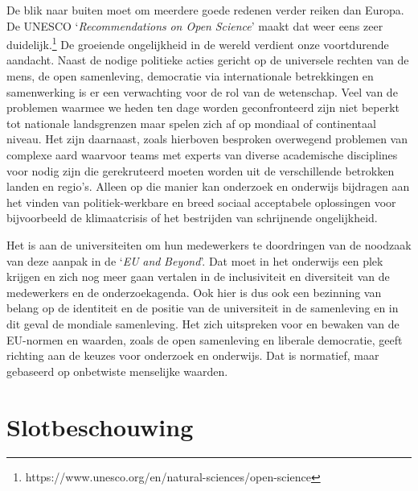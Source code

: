 \documentclass[smallauthor, chapterhaspagenum, nochapterinheader, pagenuminheader,  bigchapnum,medium2, tocpages,  garamond, titleinheader]{jote-book}
\begin{document}
	De blik naar buiten moet om meerdere goede redenen verder reiken dan Europa. De UNESCO ‘\emph{Recommendations}\emph{ on Open }\emph{Science}' maakt dat weer eens zeer duidelijk.\footnote{https://www.unesco.org/en/natural-sciences/open-science} De groeiende ongelijkheid in de wereld verdient onze voortdurende aandacht. Naast de nodige politieke acties gericht op de universele rechten van de mens, de open samenleving, democratie via internationale betrekkingen en samenwerking is er een verwachting voor de rol van de wetenschap. Veel van de problemen waarmee we heden ten dage worden geconfronteerd zijn niet beperkt tot nationale landsgrenzen maar spelen zich af op mondiaal of continentaal niveau. Het zijn daarnaast, zoals hierboven besproken overwegend problemen van complexe aard waarvoor teams met experts van diverse academische disciplines voor nodig zijn die gerekruteerd moeten worden uit de verschillende betrokken landen en regio's. Alleen op die manier kan onderzoek en onderwijs bijdragen aan het vinden van politiek-werkbare en breed sociaal acceptabele oplossingen voor bijvoorbeeld de klimaatcrisis of het bestrijden van schrijnende ongelijkheid.



	Het is aan de universiteiten om hun medewerkers te doordringen van de noodzaak van deze aanpak in de ‘\emph{EU }\emph{and}\emph{ Beyond}'. Dat moet in het onderwijs een plek krijgen en zich nog meer gaan vertalen in de inclusiviteit en diversiteit van de medewerkers en de onderzoekagenda. Ook hier is dus ook een bezinning van belang op de identiteit en de positie van de universiteit in de samenleving en in dit geval de mondiale samenleving. Het zich uitspreken voor en bewaken van de EU-normen en waarden, zoals de open samenleving en liberale democratie, geeft richting aan de keuzes voor onderzoek en onderwijs. Dat is normatief, maar gebaseerd op onbetwiste menselijke waarden.



	\section{Slotbeschouwing}
\end{document}

